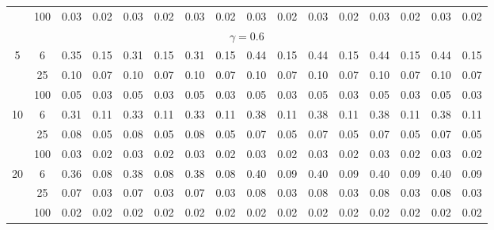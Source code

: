 \documentclass[
  man]{apa6}
\newenvironment{lltable}{\begin{landscape}\centering\begin{ThreePartTable}}{\end{ThreePartTable}\end{landscape}}
\begin{document}
\begin{lltable}
{\begin{longtable}{cccccccccccccccc}
 & 100 & 0.03 & 0.02 & 0.03 & 0.02 & 0.03 & 0.02 & 0.03 & 0.02 & 0.03 & 0.02 & 0.03 & 0.02 & 0.03 & 0.02\\
\multicolumn{16}{c}{$\gamma = 0.6$}\\
5 & 6 & 0.35 & 0.15 & 0.31 & 0.15 & 0.31 & 0.15 & 0.44 & 0.15 & 0.44 & 0.15 & 0.44 & 0.15 & 0.44 & 0.15\\
 & 25 & 0.10 & 0.07 & 0.10 & 0.07 & 0.10 & 0.07 & 0.10 & 0.07 & 0.10 & 0.07 & 0.10 & 0.07 & 0.10 & 0.07\\
 & 100 & 0.05 & 0.03 & 0.05 & 0.03 & 0.05 & 0.03 & 0.05 & 0.03 & 0.05 & 0.03 & 0.05 & 0.03 & 0.05 & 0.03\\
10 & 6 & 0.31 & 0.11 & 0.33 & 0.11 & 0.33 & 0.11 & 0.38 & 0.11 & 0.38 & 0.11 & 0.38 & 0.11 & 0.38 & 0.11\\
 & 25 & 0.08 & 0.05 & 0.08 & 0.05 & 0.08 & 0.05 & 0.07 & 0.05 & 0.07 & 0.05 & 0.07 & 0.05 & 0.07 & 0.05\\
 & 100 & 0.03 & 0.02 & 0.03 & 0.02 & 0.03 & 0.02 & 0.03 & 0.02 & 0.03 & 0.02 & 0.03 & 0.02 & 0.03 & 0.02\\
20 & 6 & 0.36 & 0.08 & 0.38 & 0.08 & 0.38 & 0.08 & 0.40 & 0.09 & 0.40 & 0.09 & 0.40 & 0.09 & 0.40 & 0.09\\
 & 25 & 0.07 & 0.03 & 0.07 & 0.03 & 0.07 & 0.03 & 0.08 & 0.03 & 0.08 & 0.03 & 0.08 & 0.03 & 0.08 & 0.03\\
 & 100 & 0.02 & 0.02 & 0.02 & 0.02 & 0.02 & 0.02 & 0.02 & 0.02 & 0.02 & 0.02 & 0.02 & 0.02 & 0.02 & 0.02\\
\bottomrule
\end{longtable}

}

\end{lltable}
\end{document}
